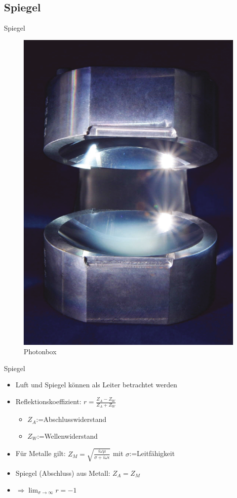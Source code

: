 \documentclass{beamer}
\begin{document}
\subsection{Spiegel}
\begin{frame}{Spiegel}
	\begin{figure}
		\center\includegraphics[width=.4\textwidth]{images/pbox.png}
		\caption{Photonbox\cite{lect}}
	\end{figure}
\end{frame}
\begin{frame}{Spiegel}
	\begin{itemize}
		\item Luft und Spiegel können als Leiter betrachtet werden
		\item Reflektionskoeffizient: $r=\frac{Z_A-Z_W}{Z_A+Z_W}$
		      \begin{itemize}
			      \item $Z_A$:=Abschlusswiderstand
			      \item $Z_W$:=Wellenwiderstand
		      \end{itemize}
		\item Für Metalle gilt: $Z_M=\sqrt{\frac{i\omega\mu}{\sigma+i\omega\epsilon}}$ mit $\sigma$:=Leitfähigkeit
		\item Spiegel (Abschluss) aus Metall: $Z_A=Z_M$
		\item $\Rightarrow \lim_{\sigma\rightarrow\infty}r=-1$
	\end{itemize}
\end{frame}
\end{document}
